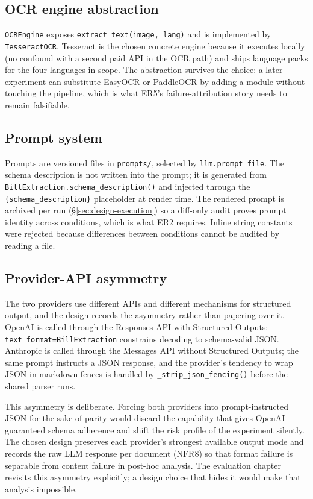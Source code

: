 \subsection{OCR engine abstraction}
\label{sec:design-components-ocr}

\texttt{OCREngine} exposes \texttt{extract\_text(image, lang)} and
is implemented by \texttt{TesseractOCR}. Tesseract is the chosen
concrete engine because it executes locally (no confound with a
second paid API in the OCR path) and ships language packs for the
four languages in scope. The abstraction survives the choice: a
later experiment can substitute EasyOCR or PaddleOCR by adding a
module without touching the pipeline, which is what ER5's
failure-attribution story needs to remain falsifiable.

\subsection{Prompt system}
\label{sec:design-components-prompt}

Prompts are versioned files in \texttt{prompts/}, selected by
\texttt{llm.prompt\_file}. The schema description is not written
into the prompt; it is generated from
\texttt{BillExtraction.schema\_description()} and injected through
the \texttt{\{schema\_description\}} placeholder at render time.
The rendered prompt is archived per run (\S\ref{sec:design-execution}) so a diff-only audit proves prompt
identity across conditions, which is what ER2 requires. Inline
string constants were rejected because differences between
conditions cannot be audited by reading a file.

\subsection{Provider-API asymmetry}
\label{sec:design-components-api}

The two providers use different APIs and different mechanisms for
structured output, and the design records the asymmetry rather
than papering over it. OpenAI is called through the Responses API
with Structured Outputs: \texttt{text\_format=BillExtraction}
constrains decoding to schema-valid JSON. Anthropic is called
through the Messages API without Structured Outputs; the same
prompt instructs a JSON response, and the provider's tendency to
wrap JSON in markdown fences is handled by
\texttt{\_strip\_json\_fencing()} before the shared parser runs.

This asymmetry is deliberate. Forcing both providers into
prompt-instructed JSON for the sake of parity would discard the
capability that gives OpenAI guaranteed schema adherence and shift
the risk profile of the experiment silently. The chosen design
preserves each provider's strongest available output mode and
records the raw LLM response per document (NFR8) so that format
failure is separable from content failure in post-hoc analysis. The
evaluation chapter revisits this asymmetry explicitly; a design
choice that hides it would make that analysis impossible.

